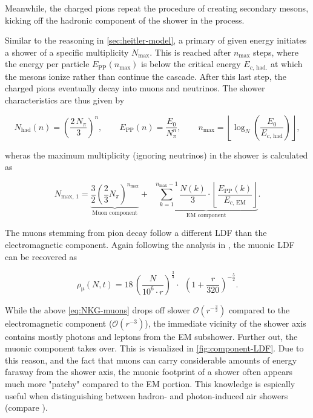 Meanwhile, the charged pions repeat the procedure of creating secondary mesons, kicking off the hadronic component of the shower in the process.

Similar to the reasoning in \autoref{sec:heitler-model}, a primary of given energy initiates a shower of a specific multiplicity $N_\text{max}$. This is reached 
after $n_\text{max}$ steps, where the energy per particle $E_\text{PP}(n_\text{max})$ is below the critical energy $E_{c,\,\text{had.}}$ at which the mesons ionize rather than 
continue the cascade. After this last step, the charged pions eventually decay into muons and neutrinos. The shower characteristics are thus given by

\begin{equation}
N_\text{had}(n) = \left(\frac{2\,N_\pi}{3}\right)^n,\qquad E_\text{PP}(n) = \frac{E_0}{N_\pi^n},\qquad n_\text{max}=\left\lfloor\log_N\left(\frac{E_0}{E_{c,\,\text{had}}}\right)\right\rfloor,
\end{equation}

wheras the maximum multiplicity (ignoring neutrinos) in the shower is calculated as

\begin{equation}
\label{eq:n-max-matthews}
N_{\text{max},\,1} = \underbrace{ \frac{3}{2}\left( \frac{2}{3}N_\pi\right)^{n_\text{max}}  }_\text{Muon component} + \;\; 
		     \underbrace{\sum\limits_{k = 1}^{n_\text{max}-1} \frac{N(k)}{3} \cdot \left\lfloor 
		     \frac{E_\text{PP}(k) }{E_{c,\,\text{EM}}}\right\rfloor}_\text{EM component}.
\end{equation}

The muons stemming from pion decay follow a different LDF than the electromagnetic component. Again following the analysis in \cite{greisen1960cosmic}, the muonic
LDF can be recovered as

\begin{equation}
\label{eq:NKG-muons}
\rho_\upmu(N, t) = 18\,\left(\frac{N}{10^6 \cdot r}\right)^\frac{3}{4} \cdot \;\,\left(1 + \frac{r}{320}\right)^{-\frac{5}{2}}.
\end{equation}

While the above \autoref{eq:NKG-muons} drops off slower $\mathcal{O}(r^{-\frac{3}{2}})$ compared to the electromagnetic component ($\mathcal{O}(r^{-3})$), the
immediate vicinity of the shower axis contains mostly photons and leptons from the EM subshower. Further out, the muonic component takes over. This is visualized
in \autoref{fig:component-LDF}. Due to this reason, and the fact that muons can carry considerable amounts of energy faraway from the shower axis, the muonic 
footprint of a shower often appears much more "patchy" compared to the EM portion. This knowledge is espically useful when distinguishing between hadron- and 
photon-induced air showers (compare \cite{capistran2015new}).

